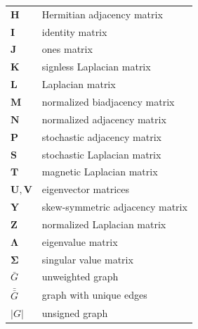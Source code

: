 \documentclass{article}
\begin{document}
\begin{longtable}{ll}
  $\mathbf H$ & Hermitian adjacency matrix \\
  $\mathbf I$ & identity matrix \\
  $\mathbf J$ & ones matrix \\
  $\mathbf K$ & signless Laplacian matrix \\
  $\mathbf L$ & Laplacian matrix \\
  $\mathbf M$ & normalized biadjacency matrix \\
  $\mathbf N$ & normalized adjacency matrix \\
  $\mathbf P$ & stochastic adjacency matrix \\
  $\mathbf S$ & stochastic Laplacian matrix \\
  $\mathbf T$ & magnetic Laplacian matrix \\
  $\mathbf U, \mathbf V$ & eigenvector matrices \\
  $\mathbf Y$ & skew-symmetric adjacency matrix \\
  $\mathbf Z$ & normalized Laplacian matrix \\
\midrule
  $\mathbf \Lambda$ & eigenvalue matrix \\
  $\mathbf \Sigma$ & singular value matrix \\
\midrule
  $\bar G$ & unweighted graph \\
  $\bar{\bar G}$ & graph with unique edges \\
  $|G|$ & unsigned graph 
\end{longtable}

 
\end{document}
